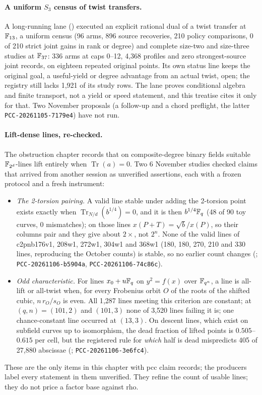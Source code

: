 \paragraph{A uniform $S_3$ census of twist transfers.} A long-running
lane () executed
an explicit rational dual of a twist transfer at $\mathbb{F}_{13}$, a uniform
census (96 arms, 896 source recoveries, 210 policy comparisons, 0 of 210
strict joint gains in rank or degree) and complete size-two and size-three
studies at $\mathbb{F}_{37}$: 336 arms at caps 0--12, 4{,}368 profiles and zero
strongest-source joint records, on eighteen repeated original points. Its
own status line keeps the original goal, a useful-yield or degree advantage
from an actual twist, open; the registry still lacks 1{,}921 of its study
rows. The lane proves conditional algebra and finite transport, not a
yield or speed statement, and this treatise cites it only for that.
Two November proposals (a follow-up and a chord preflight, the latter
\texttt{PCC-20261105-7179e4}) have not run.

\paragraph{Lift-dense lines, re-checked.} The obstruction chapter records
that on composite-degree binary fields suitable $\mathbb{F}_{2^d}$-lines lift
entirely when $\operatorname{Tr}(a)=0$. Two 6 November studies checked
claims that arrived from another session as unverified assertions, each
with a frozen protocol and a fresh instrument:
\begin{itemize}
\item \emph{The 2-torsion pairing.} A valid line stable under adding the
  2-torsion point exists exactly when $\operatorname{Tr}_{N/d}(b^{1/4})=0$,
  and it is then $b^{1/4}\mathbb{F}_q$ (48 of 90 toy curves, 0 mismatches); on
  those lines $x(P+T)=\sqrt b/x(P)$, so their columns pair and they give
  about $2\times$, not $2^n$. None of the valid lines of c2pnb176v1,
  208w1, 272w1, 304w1 and 368w1 (180, 180, 270, 210 and 330 lines,
  reproducing the October counts) is stable, so no earlier count changes
  (;
  \texttt{PCC-20261106-b5904a}, \texttt{PCC-20261106-74c86c}).
\item \emph{Odd characteristic.} For lines $x_0+u\mathbb{F}_q$ on $y^2=f(x)$ over
  $\mathbb{F}_{q^n}$, a line is all-lift or all-twist when, for every Frobenius
  orbit $O$ of the roots of the shifted cubic, $n\,r_O/s_O$ is even. All
  1{,}287 lines meeting this criterion are constant; at $(q,n)=(101,2)$
  and $(101,3)$ none of 3{,}520 lines failing it is; one chance-constant line
  occurred at $(13,3)$. On descent lines, which exist on subfield curves up
  to isomorphism, the dead fraction of lifted points is $0.505$--$0.615$ per
  cell, but the registered rule for \emph{which} half is dead mispredicts
  405 of 27{,}880 abscissae
  (;
  \texttt{PCC-20261106-3e6fc4}).
\end{itemize}
These are the only items in this chapter with pcc claim records; the
producers label every statement in them unverified. They refine the count
of usable lines; they do not price a factor base against rho.

